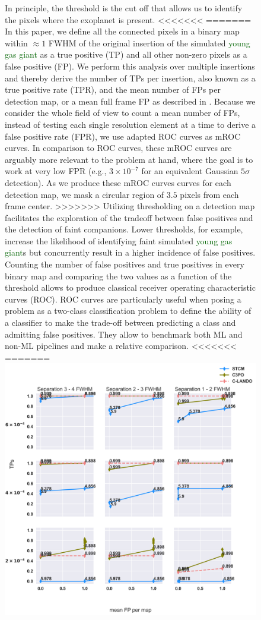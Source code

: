 \documentclass{aa}
\newcommand{\newchange}[1]{\textcolor{darkgreen}{#1}}
\begin{document}
{{{\begin{figure}[t]
In principle, the threshold is the cut off that allows us to identify the pixels where the exoplanet is present.
<<<<<<<
=======
In this paper, we define all the connected pixels in a binary map within $\approx 1$ FWHM of the original insertion of the simulated \newchange{young gas giant} as a true positive (TP) and all other non-zero pixels as a false positive (FP). We perform this analysis over multiple insertions and thereby derive the number of TPs per insertion, also known as a true positive rate (TPR), and the mean number of FPs per detection map, or a mean full frame FP as described in \citet{2018Gomez}. Because we consider the whole field of view to count a mean number of FPs, instead of testing each single resolution element at a time to derive a false positive rate (FPR), we use adapted ROC curves as mROC curves. In comparison to ROC curves, these mROC curves are arguably more relevant to the problem at hand, where the goal is to work at very low FPR (e.g., $3\times 10^{-7}$ for an equivalent Gaussian $5\sigma$ detection). As we produce these mROC curves  curves for each detection map, we mask a circular region of $3.5$ pixels from each frame center.
>>>>>>>
Utilizing thresholding on a detection map facilitates the exploration of the tradeoff between false positives and the detection of faint companions. Lower thresholds, for example, increase the likelihood of identifying faint simulated \newchange{young gas giant}s but concurrently result in a higher incidence of false positives.
Counting the number of false positives and true positives in every binary map and comparing the two values as a function of the threshold allows to produce classical receiver operating characteristic curves (ROC). 
ROC curves are particularly useful when posing a problem as a two-class classification problem to define the ability of a classifier to make the trade-off between predicting a class and admitting false positives.
They allow to benchmark both ML and non-ML pipelines and make a relative comparison. 
<<<<<<<
=======
    \includegraphics[width=1.0\textwidth]{fig4_dec2023.png}

\end{figure}}}}
\end{document}
